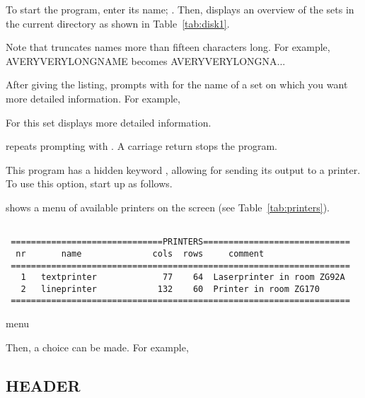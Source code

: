  
To start the program, enter its name; \carr.  Then,
 displays an overview of the sets in the current
directory as shown in Table~\ref{tab:disk1}.
 
Note that  truncates names more than fifteen characters
long.  For example, AVERYVERYLONGNAME becomes AVERYVERYLONGNA...
 
After giving the listing,  prompts with 
for the name of a set on which you want more detailed information.  For
example,


For this set  displays more detailed information.

 repeats prompting with .  A carriage
return stops the program. 

This program has a hidden keyword , allowing for
sending its output to a printer.  To use this option, start up
 as follows. 
 
 
 shows a menu of available printers on the screen (see
Table~\ref{tab:printers}). 

\begin{table}[tbh]
\begin{center}
\begin{verbatim}

 ==============================PRINTERS=============================
  nr       name              cols  rows     comment
 ===================================================================
   1   textprinter             77    64  Laserprinter in room ZG92A
   2   lineprinter            132    60  Printer in room ZG170
 ===================================================================

\end{verbatim}

\caption{ menu}
\label{tab:printers}
\end{center}
\end{table}

 
Then, a choice can be made.  For example, 
 

\subsection*{HEADER}

